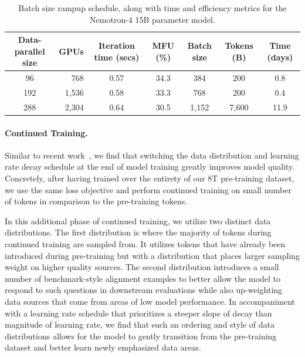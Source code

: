 \documentclass[11pt]{article}
\newcommand{\ours}{Nemotron-4}
\begin{document}

\begin{table}[H]
    \centering
    \begin{tabular}{crccccc}
    \toprule
    Data-parallel size & GPUs & Iteration time (secs) & MFU (\%) & Batch size & Tokens (B) & Time (days) \\
    \toprule
    96 &  768 & 0.57 & 34.3 & 384 &  200 & 0.8 \\
    192 & 1,536 & 0.58 & 33.3 & 768 &  200 & 0.4 \\
    288 & 2,304 & 0.64 & 30.5 & 1,152 &  7,600 & 11.9   \\
    \bottomrule
    \end{tabular}
    \caption{Batch size rampup schedule, along with time and efficiency metrics for the \ours{} 15B parameter model.}
    \label{tab:43bmodel_batch_time_mfu}
\end{table}

\paragraph{Continued Training.}
Similar to recent work~\citep{geminiteam2023gemini}, we find that switching the data distribution and learning rate decay schedule at the end of model training greatly improves model quality. Concretely, after having trained over the entirety of our 8T pre-training dataset, we use the same loss objective and perform continued training on small number of tokens in comparison to the pre-training tokens. 

In this additional phase of continued training, we utilize two distinct data distributions. 
The first distribution is where the majority of tokens during continued training are sampled from. It utilizes tokens that have already been introduced during pre-training but with a distribution that places larger sampling weight on higher quality sources. 
The second distribution introduces a small number of benchmark-style alignment examples to better allow the model to respond to such questions in downstream evaluations while also up-weighting data sources that come from areas of low model performance. 
In accompaniment with a learning rate schedule that prioritizes a steeper slope of decay than magnitude of learning rate, we find that such an ordering and style of data distributions allows for the model to gently transition from the pre-training dataset and better learn newly emphasized data areas. 
\end{document}
